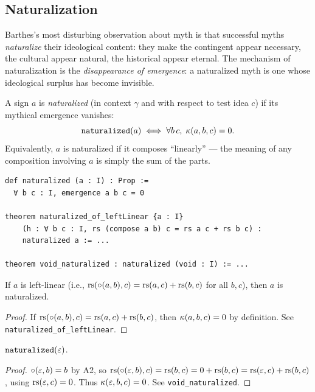 \subsection{Naturalization}

Barthes's most disturbing observation about myth is that successful
myths \emph{naturalize} their ideological content: they make the
contingent appear necessary, the cultural appear natural, the
historical appear eternal. The mechanism of naturalization is the
\emph{disappearance of emergence}: a naturalized myth is one whose
ideological surplus has become invisible.

\begin{definition}
\label{def:naturalized}
A sign $a$ is \emph{naturalized} (in context $\gamma$ and with respect
to test idea $c$) if its mythical emergence vanishes:
\[
  \texttt{naturalized}(a) \iff \forall b\, c,\;
  \kappa(a, b, c) = 0.
\]
Equivalently, $a$ is naturalized if it composes ``linearly'' ---
the meaning of any composition involving $a$ is simply the sum of
the parts.
\end{definition}

\begin{lstlisting}[caption={Naturalization: the vanishing of emergence}]
def naturalized (a : I) : Prop :=
  ∀ b c : I, emergence a b c = 0

theorem naturalized_of_leftLinear {a : I}
    (h : ∀ b c : I, rs (compose a b) c = rs a c + rs b c) :
    naturalized a := ...

theorem void_naturalized : naturalized (void : I) := ...
\end{lstlisting}

\begin{theorem}
\label{thm:naturalized-leftlinear}
If $a$ is left-linear (i.e., $\mathrm{rs}(\circ(a, b), c) = \mathrm{rs}(a, c) +
\mathrm{rs}(b, c)$ for all $b, c$), then $a$ is naturalized.
\end{theorem}

\begin{proof}
If $\mathrm{rs}(\circ(a,b), c) = \mathrm{rs}(a,c) + \mathrm{rs}(b,c)$, then
$\kappa(a,b,c) = 0$ by definition. See
\texttt{naturalized\_of\_leftLinear}.
\end{proof}

\begin{theorem}
\label{thm:void-naturalized}
$\texttt{naturalized}(\varepsilon)$.
\end{theorem}

\begin{proof}
$\circ(\varepsilon, b) = b$ by A2, so $\mathrm{rs}(\circ(\varepsilon, b), c) =
\mathrm{rs}(b, c) = 0 + \mathrm{rs}(b, c) = \mathrm{rs}(\varepsilon, c) + \mathrm{rs}(b, c)$, using
$\mathrm{rs}(\varepsilon, c) = 0$. Thus $\kappa(\varepsilon, b, c) = 0$. See
\texttt{void\_naturalized}.
\end{proof}

